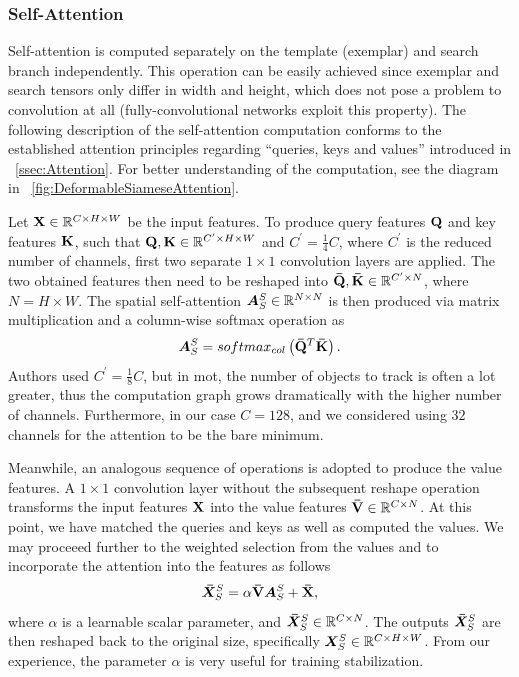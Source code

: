 \subsubsection{Self-Attention}

Self-attention is computed separately on the template (exemplar) and search branch independently. This operation can be easily achieved since exemplar and search tensors only differ in width and height, which does not pose a problem to convolution at all (fully-convolutional networks exploit this property). The following description of the self-attention computation conforms to the established attention principles regarding ``queries, keys and values'' introduced in \sectiontext{}~\ref{ssec:Attention}. For better understanding of the computation, see the diagram in \figtext{}~\ref{fig:DeformableSiameseAttention}.

Let $\mathbf{X} \in \mathbb{R}^{{C} \times {H} \times {W}}$ be the input features. To produce query features $\mathbf{Q}$ and key features $\mathbf{K}$, such that $\mathbf{Q}, \mathbf{K} \in \mathbb{R}^{{C^{\prime}} \times {H} \times {W}}$ and $C^{\prime} = \frac{1}{4}C$, where $C^{\prime}$ is the reduced number of channels, first two separate $1 \times 1$ convolution layers are applied. The two obtained features then need to be reshaped into $\mathbf{\bar{Q}}, \mathbf{\bar{K}} \in \mathbb{R}^{{C^{\prime}} \times {N}}$, where $N = H \times W$. The spatial self-attention $\bm{A}_{S}^{S} \in \mathbb{R}^{{N} \times {N}}$ is then produced via matrix multiplication and a column-wise softmax operation as
\begin{equation}
    \label{eq:SpatialSelfAttention}
    \bm{A}_{S}^{S} =
    {softmax_{col}} \left( \mathbf{\bar{Q}}^T \mathbf{\bar{K}} \right).
\end{equation}
Authors used $C^{\prime} = \frac{1}{8}C$, but in \gls{mot}, the number of objects to track is often a lot greater, thus the computation graph grows dramatically with the higher number of channels. Furthermore, in our case $C = 128$, and we considered using $32$ channels for the attention to be the bare minimum.

Meanwhile, an analogous sequence of operations is adopted to produce the value features. A $1 \times 1$ convolution layer without the subsequent reshape operation transforms the input features $\mathbf{X}$ into the value features $\mathbf{\bar{V}} \in \mathbb{R}^{{C} \times {N}}$. At this point, we have matched the queries and keys as well as computed the values. We may proceeed further to the weighted selection from the values and to incorporate the attention into the features as follows
\begin{equation}
    \label{eq:SpatialSelfAttentionApplication}
    \bm{\bar{X}}_{S}^{S} =
    \alpha \mathbf{\bar{V}} \bm{A}_{S}^{S} + \mathbf{\bar{X}},
\end{equation}
where $\alpha$ is a learnable scalar parameter, and $\bm{\bar{X}}_{S}^{S} \in \mathbb{R}^{{C} \times {N}}$. The outputs $\bm{\bar{X}}_{S}^{S}$ are then reshaped back to the original size, specifically $\bm{X}_{S}^{S} \in \mathbb{R}^{{C} \times {H} \times {W}}$. From our experience, the parameter $\alpha$ is very useful for training stabilization.

